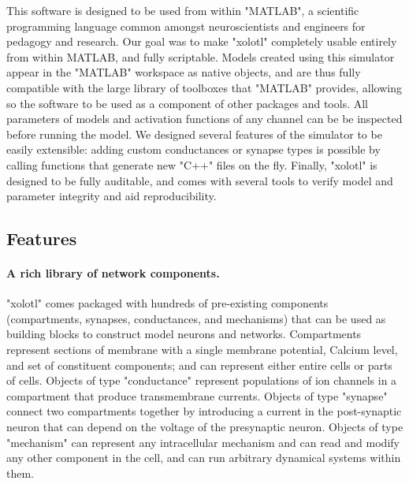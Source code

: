 \documentclass{frontiersSCNS} %
\begin{document}
This software is designed to be used from within "MATLAB", a scientific programming language common amongst neuroscientists and engineers for pedagogy and research. Our goal was to make "xolotl" completely usable entirely from within MATLAB, and fully scriptable. Models created using this simulator appear in the "MATLAB" workspace as native objects, and are thus fully compatible with the large library of toolboxes that "MATLAB" provides, allowing so the software to be used as a component of other packages and tools. All parameters of models and activation functions of any channel can be be inspected before running the model. We designed several features of the simulator to be easily extensible: adding custom conductances or synapse types is possible by calling functions that generate new "C++" files on the fly. Finally, "xolotl" is designed to be fully auditable, and comes with several tools to verify model and parameter integrity and aid reproducibility.



\subsection{Features}
\label{features}

\paragraph{A rich library of network components.} "xolotl" comes packaged with hundreds of pre-existing components (compartments, synapses, conductances, and mechanisms) that can be used as building blocks to construct model neurons and networks. Compartments represent sections of membrane with a single membrane potential, Calcium level, and set of constituent components; and can represent either entire cells or parts of cells. Objects of type "conductance" represent populations of ion channels in a compartment that produce transmembrane currents. Objects of type "synapse" connect two compartments together by introducing a current in the post-synaptic neuron that can depend on the voltage of the presynaptic neuron. Objects of type "mechanism" can represent any intracellular mechanism and can read and modify any other component in the cell, and can run arbitrary dynamical systems within them.
\end{document}
